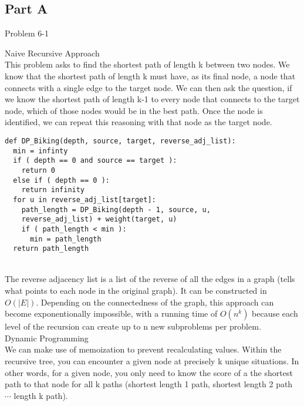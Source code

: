\documentclass[12pt,twoside]{article}
\begin{document}
\begin{problems}

\section*{Part A}
\problem Problem 6-1
\begin{problemparts}
\problempart Naive Recursive Approach\\
This problem asks to find the shortest path of length k between two nodes.  We know that the shortest path of length k must have, as its final node, a node that connects with a single edge to the target node.  We can then ask the question, if we know the shortest path of length k-1 to every node that connects to the target node, which of those nodes would be in the best path.  Once the node is identified, we can repeat this reasoning with that node as the target node.\\

\begin{lstlisting}
def DP_Biking(depth, source, target, reverse_adj_list):
  min = infinty
  if ( depth == 0 and source == target ): 
    return 0
  else if ( depth == 0 ):
    return infinity
  for u in reverse_adj_list[target]:
    path_length = DP_Biking(depth - 1, source, u, 
	reverse_adj_list) + weight(target, u)
    if ( path_length < min ):
      min = path_length
  return path_length
\end{lstlisting}\\

The reverse adjacency list is a list of the reverse of all the edges in a graph (tells what points to each node in the original graph).  It can be constructed in $O(|E|)$.  Depending on the connectedness of the graph, this approach can become exponentionally impossible, with a running time of $O(n^k)$ because each level of the recursion can create up to n new subproblems per problem.\\   
\problempart Dynamic Programming\\
We can make use of memoization to prevent recalculating values.  Within the recursive tree, you can encounter a given node at precisely k unique situations.  In other words, for a given node, you only need to know the score of a the shortest path to that node for all k paths (shortest length 1 path, shortest length 2 path $\cdots$ length k path).\\

\begin{lstlisting} 


\end{lstlisting}
\end{problemparts}
\end{problems}
\end{document}
